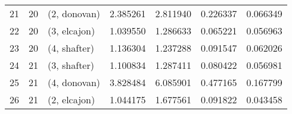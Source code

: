 \begin{tabular}{lllrrrr}
21 &    20 &  (2, donovan) &  2.385261 &  2.811940 &   0.226337 &  0.066349 \\
22 &    20 &  (3, elcajon) &  1.039550 &  1.286633 &   0.065221 &  0.056963 \\
23 &    20 &  (4, shafter) &  1.136304 &  1.237288 &   0.091547 &  0.062026 \\
24 &    21 &  (3, shafter) &  1.100834 &  1.287411 &   0.080422 &  0.056981 \\
25 &    21 &  (4, donovan) &  3.828484 &  6.085901 &   0.477165 &  0.167799 \\
26 &    21 &  (2, elcajon) &  1.044175 &  1.677561 &   0.091822 &  0.043458 \\
\bottomrule
\end{tabular}
